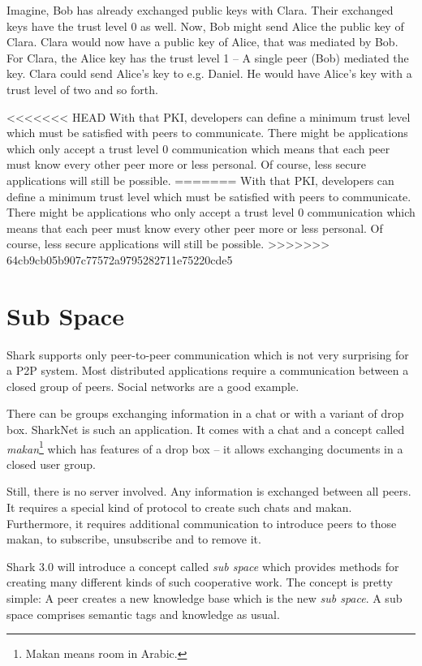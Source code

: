 Imagine, Bob has already exchanged public keys with Clara. Their exchanged keys have the trust level 0 as well. Now, Bob might send Alice the public key of Clara. Clara would now have a public key of Alice, that was mediated by Bob. For Clara, the Alice key has the trust level 1 -- A single peer (Bob) mediated the key. Clara could send Alice's key to e.g. Daniel. He would have Alice's key with a trust level of two and so forth.

<<<<<<< HEAD
With that PKI, developers can define a minimum trust level which must be satisfied with peers to communicate. There might be applications which only accept a trust level 0 communication which means that each peer must know every other peer more or less personal. Of course, less secure applications will still be possible.
=======
With that PKI, developers can define a minimum trust level which must be satisfied with peers to communicate. There might be applications who only accept a trust level 0 communication which means that each peer must know every other peer more or less personal. Of course, less secure applications will still be possible.
>>>>>>> 64cb9cb05b907c77572a9795282711e75220cde5

\section{Sub Space}
Shark supports only peer-to-peer communication which is not very surprising for a P2P system. Most distributed applications require a communication between a closed group of peers. Social networks are a good example.

There can be groups exchanging information in a chat or with a variant of drop box. SharkNet is such an application. It comes with a chat and a concept called {\it makan}\footnote{Makan means room in Arabic.} which has features of a drop box -- it allows exchanging documents in a closed user group.

Still, there is no server involved. Any information is exchanged between all peers. It requires a special kind of protocol to create such chats and makan. Furthermore, it requires additional communication to introduce peers to those makan, to subscribe, unsubscribe and to remove it.

Shark 3.0 will introduce a concept called {\it sub space} which provides methods for creating many different kinds of such cooperative work. The concept is pretty simple: A peer creates a new knowledge base which is the new {\it sub space}. 
A sub space comprises semantic tags and knowledge as usual.

